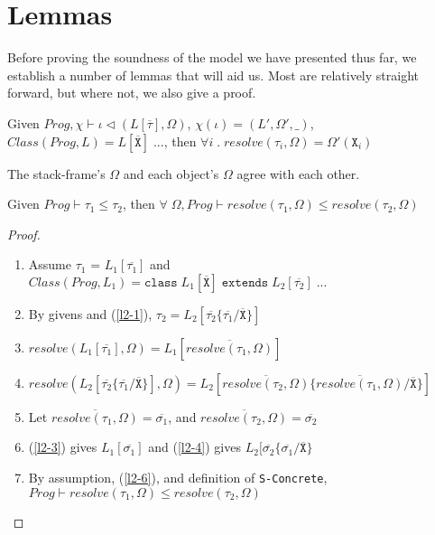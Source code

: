 \newpage

\section{Lemmas}

Before proving the soundness of the model we have presented thus far, we establish a number of lemmas that will aid us. Most are relatively straight forward, but where not, we also give a proof.

\begin{lemma} \label{lemma:1}
Given $Prog, \chi \vdash \iota \triangleleft (L[\overline{\tau}], \Omega)$, $\chi(\iota) = (L', \Omega', \_)$, $Class(Prog, L) = L[\overline{\texttt{X}}] \; ...$, then $\forall i \; . \; resolve(\tau_i, \Omega) = \Omega'(\texttt{X}_i)$
\end{lemma}

The stack-frame's $\Omega$ and each object's $\Omega$ agree with each other.

\begin{lemma} \label{lemma:2}
Given $Prog \vdash \tau_1 \leq \tau_2$, then $\forall \; \Omega, Prog \vdash resolve(\tau_1, \Omega) \leq resolve(\tau_2, \Omega)$
\end{lemma}
\begin{proof}
\begin{enumerate}
    \item \label{l2-1} Assume $\tau_1$ = $L_1[\overline{\tau_1}]$ and $Class(Prog, L_1) = \texttt{class} \; L_1[\overline{\texttt{X}}] \; \texttt{extends} \; L_2[\overline{\tau_2}] \; ...$
    \item By givens and (\ref{l2-1}), $\tau_2 = L_2[\overline{\tau_2} \{\overline{\tau_1}/\overline{\texttt{X}} \}]$
    \item \label{l2-3} $resolve(L_1[\overline{\tau_1}], \Omega) = L_1[\overline{resolve({\tau_1}, \Omega)}]$
    \item \label{l2-4} $resolve(L_2[\overline{\tau_2} \{\overline{\tau_1}/\overline{\texttt{X}} \}], \Omega) = L_2[\overline{resolve(\tau_2, \Omega)} \{\overline{resolve(\tau_1, \Omega)}/\overline{\texttt{X}} \}]$
    \item \label{l2-5}Let $\overline{resolve(\tau_1, \Omega)} = \overline{\sigma_1}$, and $\overline{resolve(\tau_2, \Omega)} = \overline{\sigma_2}$
    \item \label{l2-6}(\ref{l2-3}) gives $L_1[\overline{\sigma_1}]$ and (\ref{l2-4}) gives $L_2[\overline{\sigma_2}\{\overline{\sigma_1}/\overline{\texttt{X}}\}$
    \item By assumption, (\ref{l2-6}), and definition of \texttt{S-Concrete}, $Prog \vdash resolve(\tau_1, \Omega) \leq resolve(\tau_2, \Omega)$
\end{enumerate}
\end{proof}

